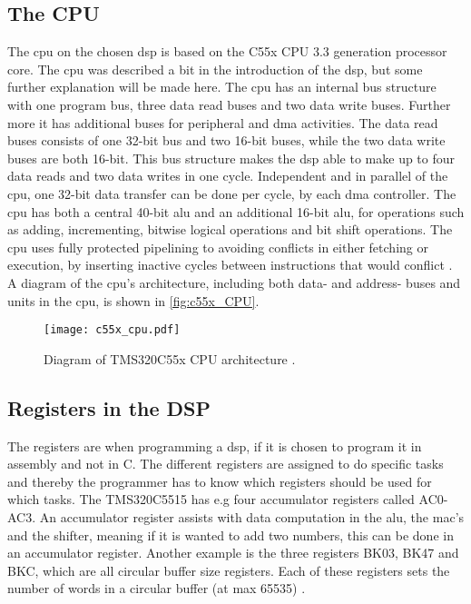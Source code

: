 \subsection{The CPU}
The \gls{cpu} on the chosen \gls{dsp} is based on the C55x CPU 3.3 generation processor core. The \gls{cpu} was described a bit in the introduction of the \gls{dsp}, but some further explanation will be made here. The \gls{cpu} has an internal bus structure with one program bus, three data read buses and two data write buses. Further more it has additional buses for peripheral and \gls{dma} activities. The data read buses consists of one 32-bit bus and two 16-bit buses, while the two data write buses are both 16-bit. This bus structure makes the \gls{dsp} able to make up to four data reads and two data writes in one cycle. Independent and in parallel of the \gls{cpu}, one 32-bit data transfer can be done per cycle, by each \gls{dma} controller. The \gls{cpu} has both a central 40-bit \gls{alu} and an additional 16-bit \gls{alu}, for operations such as adding, incrementing, bitwise logical operations and bit shift operations. 
The \gls{cpu} uses fully protected pipelining to avoiding conflicts in either fetching or execution, by inserting inactive cycles between instructions that would conflict \cite{c55x_cpu}.
A diagram of the \gls{cpu}'s architecture, including both data- and address- buses and units in the \gls{cpu}, is shown in \autoref{fig:c55x_CPU}.

\begin{figure}[!h]
    \centering
        \texttt{[image: c55x\_cpu.pdf]}
        \caption{Diagram of TMS320C55x CPU architecture \cite{c55x_cpu}.}
        \label{fig:c55x_CPU}
  \end{figure}  
  
\subsection{Registers in the DSP}
The registers are when programming a \gls{dsp}, if it is chosen to program it in assembly and not in C. The different registers are assigned to do specific tasks and thereby the programmer has to know which registers should be used for which tasks. The TMS320C5515 has e.g four accumulator registers called AC0-AC3. An accumulator register assists with data computation in the \gls{alu}, the \gls{mac}'s and the shifter, meaning if it is wanted to add two numbers, this can be done in an accumulator register. 
Another example is the three registers BK03, BK47 and BKC, which are all circular buffer size registers. Each of these registers sets the number of words in a circular buffer (at max 65535) \cite{c55x_cpu}.  

